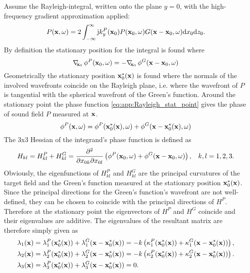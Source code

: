 Assume the Rayleigh-integral, written onto the plane $y = 0$, with the high-frequency gradient approximation applied:
\begin{equation}
P(\mathbf{x},\omega) = 2 \int_{-\infty}^{\infty} \mathrm{j} k_y^P(\mathbf{x}_0) P(\mathbf{x}_0, \omega) G(\mathbf{x}-\mathbf{x}_0,\omega) \mathrm{d} x_0  \mathrm{d} z_0.
\end{equation}
By definition the stationary position for the integral is found where
\begin{equation}
\label{eq:app:Rayleigh_stat_point}
\nabla_{\!\!\mathbf{x}_0}\, \phi^P(\mathbf{x}_0,\omega) = -\nabla_{\!\!\mathbf{x}_0}\, \phi^G(\mathbf{x}-\mathbf{x}_0,\omega)  \\
\end{equation}
Geometrically the stationary position $\mathbf{x}_0^*(\mathbf{x})$ is found where the normals of the involved wavefronts coincide on the Rayleigh plane, i.e. where the wavefront of $P$ is tangential with the spherical wavefront of the Green's function.
Around the stationary point the phase function \eqref{eq:app:Rayleigh_stat_point} gives the phase of sound field $P$ measured at $\mathbf{x}$.
\begin{equation}
\phi^P(\mathbf{x},\omega) = \phi^P(\mathbf{x}_0^*(\mathbf{x}),\omega) + \phi^G(\mathbf{x}-\mathbf{x}_0^*(\mathbf{x}),\omega)  \\
\end{equation}
The 3x3 Hessian of the integrand's phase function is defined as
\begin{equation}
\label{eq:app:Hessian_for_Rayleigh}
H_{kl} = H_{kl}^P+ H_{kl}^G = \frac{\partial^2}{\partial x_{0 k} \partial x_{0 l}}\left( \phi^P(\mathbf{x}_0,\omega) + \phi^G(\mathbf{x}-\mathbf{x}_0,\omega) \right), \hspace{3mm} k,l = 1,2,3.
\end{equation}
Obviously, the eigenfunctions of $H_{kl}^P$ and $H_{kl}^G$ are the principal curvatures of the target field and the Green's function measured at the stationary position $\mathbf{x}_0^*(\mathbf{x})$.
Since the principal directions for the Green's function's wavefront are not well-defined, they can be chosen to coincide with the principal directions of $H^P$.
Therefore at the stationary point the eigenvectors of $H^P$ and $H^G$ coincide and their eigenvalues are additive.
The eigenvalues of the resultant matrix are therefore simply given as
\begin{align}
\label{eq:app:propagated_curvature}
\lambda_1(\mathbf{x}) &= \lambda_1^P(\mathbf{x}_0^*(\mathbf{x})) + \lambda_1^G(\mathbf{x}-\mathbf{x}_0^*(\mathbf{x})) = -k \left( \kappa_1^P(\mathbf{x}_0^*(\mathbf{x})) + \kappa_1^G(\mathbf{x}-\mathbf{x}_0^*(\mathbf{x})) \right), \\
\lambda_2(\mathbf{x}) &= \lambda_2^P(\mathbf{x}_0^*(\mathbf{x})) + \lambda_2^G(\mathbf{x}-\mathbf{x}_0^*(\mathbf{x})) = -k \left( \kappa_2^P(\mathbf{x}_0^*(\mathbf{x})) + \kappa_2^G(\mathbf{x}-\mathbf{x}_0^*(\mathbf{x})) \right). \\
\lambda_3(\mathbf{x}) &= \lambda_3^P(\mathbf{x}_0^*(\mathbf{x})) + \lambda_3^G(\mathbf{x}-\mathbf{x}_0^*(\mathbf{x})) = 0.
\end{align}
\vspace{0.5mm}

